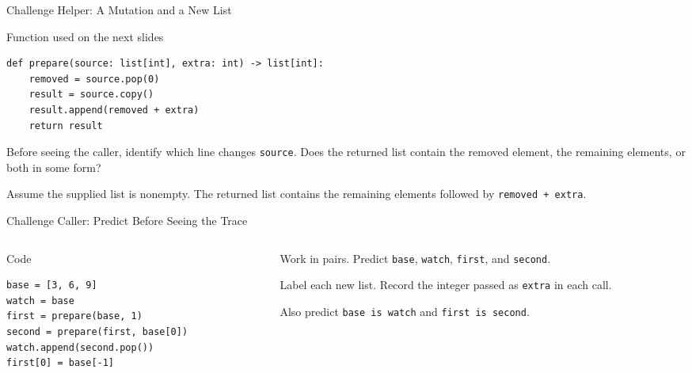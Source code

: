 \documentclass[aspectratio=169,10pt]{beamer}
\begin{document}

\begin{frame}[fragile]{Challenge Helper: A Mutation and a New List}
  \begin{block}{Function used on the next slides}
\begin{verbatim}
def prepare(source: list[int], extra: int) -> list[int]:
    removed = source.pop(0)
    result = source.copy()
    result.append(removed + extra)
    return result
\end{verbatim}
  \end{block}
  \begin{activity}
    Before seeing the caller, identify which line changes \texttt{source}. Does the returned list contain the removed element, the remaining elements, or both in some form?
  \end{activity}
  Assume the supplied list is nonempty. The returned list contains the remaining elements followed by \texttt{removed + extra}.
\end{frame}

\begin{frame}[fragile]{Challenge Caller: Predict Before Seeing the Trace}
  \begin{columns}[T,onlytextwidth]
    \begin{column}{0.53\textwidth}
      \begin{block}{Code}
\begin{verbatim}
base = [3, 6, 9]
watch = base
first = prepare(base, 1)
second = prepare(first, base[0])
watch.append(second.pop())
first[0] = base[-1]
\end{verbatim}
      \end{block}
    \end{column}
    \begin{column}{0.42\textwidth}
      \begin{activity}
        Work in pairs. Predict \texttt{base}, \texttt{watch}, \texttt{first}, and \texttt{second}.

        Label each new list. Record the integer passed as \texttt{extra} in each call.
      \end{activity}
      Also predict \texttt{base is watch} and \texttt{first is second}.
    \end{column}
  \end{columns}
\end{frame}
\end{document}
